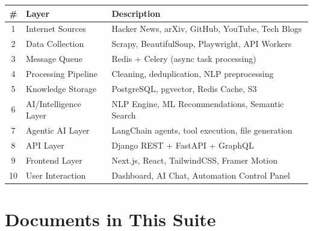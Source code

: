 \documentclass[12pt,a4paper]{report}
\begin{document}
\begin{center}
\begin{tabular}{clp{8cm}}
\toprule
\textbf{\#} & \textbf{Layer} & \textbf{Description} \\
\midrule
1 & Internet Sources        & Hacker News, arXiv, GitHub, YouTube, Tech Blogs \\
2 & Data Collection         & Scrapy, BeautifulSoup, Playwright, API Workers \\
3 & Message Queue           & Redis + Celery (async task processing) \\
4 & Processing Pipeline     & Cleaning, deduplication, NLP preprocessing \\
5 & Knowledge Storage       & PostgreSQL, pgvector, Redis Cache, S3 \\
6 & AI/Intelligence Layer   & NLP Engine, ML Recommendations, Semantic Search \\
7 & Agentic AI Layer        & LangChain agents, tool execution, file generation \\
8 & API Layer               & Django REST + FastAPI + GraphQL \\
9 & Frontend Layer          & Next.js, React, TailwindCSS, Framer Motion \\
10 & User Interaction        & Dashboard, AI Chat, Automation Control Panel \\
\bottomrule
\end{tabular}
\end{center}

\section*{Documents in This Suite}
\end{document}

